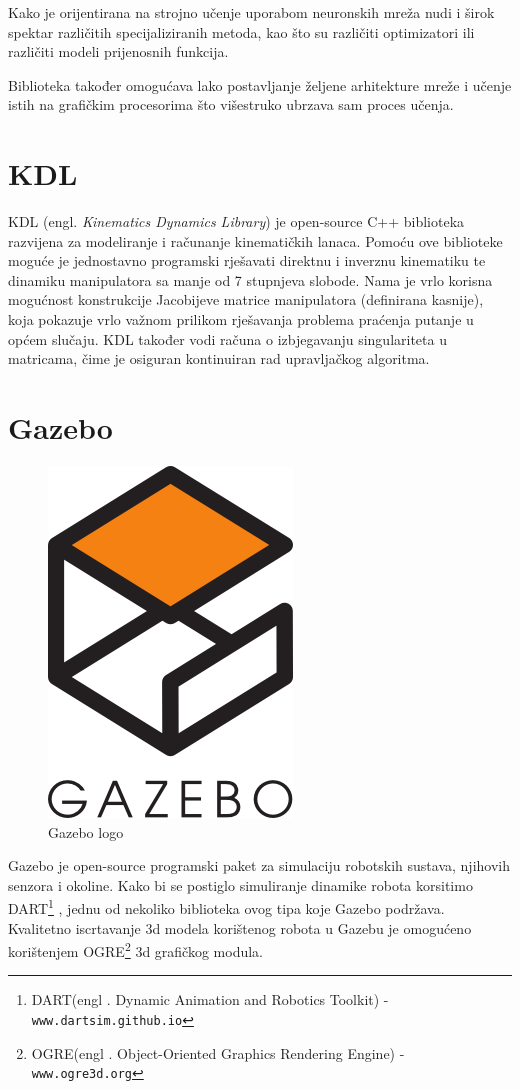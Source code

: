 \documentclass[times, utf8, diplomski, numeric]{fer}
\begin{document}
Kako je orijentirana na strojno učenje uporabom neuronskih mreža nudi i širok spektar različitih specijaliziranih metoda, kao što su različiti optimizatori ili različiti modeli prijenosnih funkcija.

Biblioteka također omogućava lako postavljanje željene arhitekture mreže i učenje istih na grafičkim procesorima što višestruko ubrzava sam proces učenja.

\section{KDL}
KDL (engl. \textit{Kinematics Dynamics Library}) je open-source C++ biblioteka razvijena za modeliranje i računanje kinematičkih lanaca.
Pomoću ove biblioteke moguće je jednostavno programski rješavati direktnu i inverznu kinematiku te dinamiku manipulatora sa manje od 7 stupnjeva slobode.
Nama je vrlo korisna mogućnost konstrukcije Jacobijeve matrice manipulatora (definirana kasnije), koja pokazuje vrlo važnom prilikom rješavanja problema praćenja putanje u općem slučaju.
KDL također vodi računa o izbjegavanju singulariteta u matricama, čime je osiguran kontinuiran rad upravljačkog algoritma.

\section{Gazebo}
\begin{figure}[H]
\centering
\includegraphics[scale=0.3]{gazebo_1}
\caption{Gazebo logo}
\end{figure}
Gazebo je open-source programski paket za simulaciju robotskih sustava, njihovih senzora i okoline.
Kako bi se postiglo simuliranje dinamike robota korsitimo DART\footnote{DART(engl . Dynamic Animation and Robotics Toolkit) - \texttt{www.dartsim.github.io}} , jednu od nekoliko biblioteka ovog tipa koje Gazebo podržava.
Kvalitetno iscrtavanje 3d modela korištenog robota u Gazebu je omogućeno korištenjem OGRE\footnote{OGRE(engl . Object-Oriented Graphics Rendering Engine) - \texttt{www.ogre3d.org}} 3d grafičkog modula.
\end{document}

